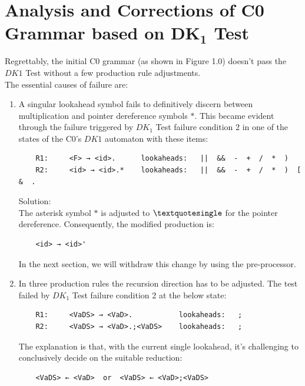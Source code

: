 \newpage


\section{Analysis and Corrections of C0 Grammar based on \(\boldsymbol{DK_{1}}\) Test}\label{sec:Analysis and Corrections of C0 Grammar based on DK1 Test}

Regrettably, the initial C0 grammar (as shown in Figure 1.0) doesn’t pass the \(DK1\) Test without a few production rule adjustments.\\

The essential causes of failure are:

\begin{enumerate}
    \item A singular lookahead symbol fails to definitively discern between multiplication and pointer dereference symbols \(\ast\). This became evident through the failure triggered by \({DK_{1}}\) Test failure condition 2 in one of the states of the C0's \(DK1\) automaton with these items:
    \begin{verbatim}
    R1:     <F> → <id>.      lookaheads:   ||  &&  -  +  /  *  )
    R2:     <id> → <id>.*    lookaheads:   ||  &&  -  +  /  *  )  [  &  .
    \end{verbatim}
    Solution: \\
    The asterisk symbol \(\ast\) is adjusted to \(\textquotesingle\) for the pointer dereference. Consequently, the modified production is:
    \begin{verbatim}
    <id> → <id>'
    \end{verbatim}
    In the next section, we will withdraw this change by using the pre-processor.

    \item In three production rules the recursion direction has to be adjusted.
    The test failed by \({DK_{1}}\) Test failure condition 2 at the below state:
    \begin{verbatim}
    R1:     <VaDS> → <VaD>.           lookaheads:   ;
    R2:     <VaDS> → <VaD>.;<VaDS>    lookaheads:   ;
    \end{verbatim}
    The explanation is that, with the current single lookahead, it’s challenging to conclusively decide on the suitable reduction:
    \begin{verbatim}
    <VaDS> ← <VaD>  or  <VaDS> ← <VaD>;<VaDS>
    \end{verbatim}


\end{enumerate}
